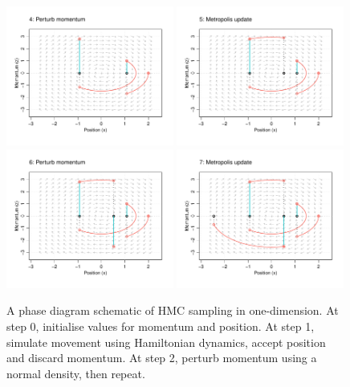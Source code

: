 \begin{figure}[p]
  \vspace{-20pt}
  \includegraphics[width=0.49\textwidth]{figure/04-phase5}
  \includegraphics[width=0.49\textwidth]{figure/04-phase6}
  \vspace{-20pt}  
  \includegraphics[width=0.49\textwidth]{figure/04-phase7}
  \includegraphics[width=0.49\textwidth]{figure/04-phase8}
  \caption[A phase diagram schematic of HMC sampling in one-dimension]{A phase diagram schematic of HMC sampling in one-dimension. At step 0, initialise values for momentum and position. At step 1, simulate movement using Hamiltonian dynamics, accept position and discard momentum. At step 2, perturb momentum using a normal density, then repeat.}
\end{figure}
\vspace{-0.5em}


